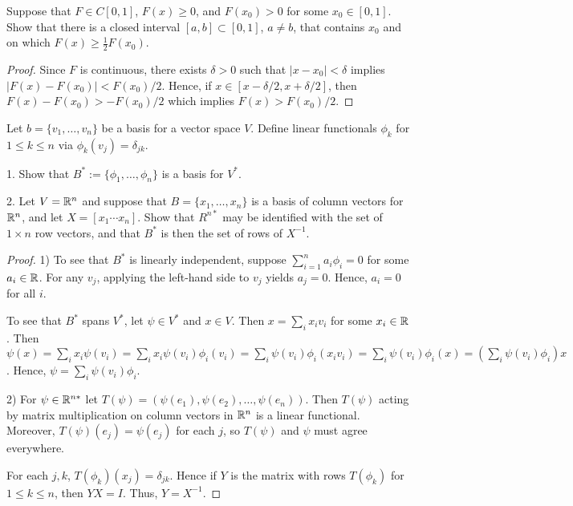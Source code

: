 \documentclass{article}
\begin{document}
 Suppose that $F \in C[0,1]$, $F(x) \ge 0$, and $F(x_0) > 0$ for some $x_0 \in [0,1]$. Show that there is a closed interval $[a,b] \subset [0,1]$, $a \ne b$, that contains $x_0$ and on which $F(x) \ge \frac 1 2 F(x_0)$.

\begin{proof}
Since $F$ is continuous, there exists $\delta > 0$ such that 
$|x - x_0| < \delta$ implies $|F(x) - F(x_0)| < F(x_0)/2$.  Hence, if $x \in [x - \delta/2, x + \delta/2]$,  then $F(x) - F(x_0) > -F(x_0)/2$ which implies $F(x) > F(x_0)/2$.
\end{proof}

 Let $b = \{v_1, \ldots, v_n\}$ be a basis for a vector space $V$. Define linear functionals $\phi_k$ for $1 \le k \le n$ via $\phi_k(v_j) = \delta_{jk}$.

1. Show that $B^* := \{\phi_1, \ldots, \phi_n\}$ is a basis for $V^*$.

2. Let $V = \mathbb{R}^n$ and suppose that $B = \{ x_1, \ldots, x_n\}$ is a basis of column vectors for $\mathbb{R}^n$, and let $X = [x_1 \cdots x_n]$. Show that $R^{n*}$ may be identified with the set of $1 \times n$ row vectors, and that $B^*$ is then the set of rows of $X^{-1}$.

\begin{proof}
1) To see that $B^*$ is linearly independent, suppose $\sum_{i=1}^n a_i \phi_i = 0$ for some $a_i \in \mathbb{R}$.  For any $v_j$, applying the left-hand side to $v_j$ yields $a_j = 0$. Hence, $a_i = 0$ for all $i$.

To see that $B^*$ spans $V^*$, let $\psi \in V^*$ and $x \in V$.  Then $x = \sum_i x_i v_i$ for some $x_i \in \mathbb{R}$. Then $\psi(x) = \sum_i x_i \psi(v_i) = \sum_i x_i \psi(v_i) \phi_i(v_i) = \sum_i \psi(v_i) \phi_i(x_iv_i) = \sum_i \psi(v_i) \phi_i(x) = (\sum_i \psi(v_i) \phi_i) x$. Hence, $\psi = \sum_i \psi(v_i) \phi_i$.

2) For $\psi \in \mathbb{R}^{n*}$ let $T(\psi) = (\psi(e_1), \psi(e_2), \ldots, \psi(e_n))$. Then $T(\psi)$ acting by matrix multiplication on column vectors in $\mathbb{R}^n$ is a linear functional. Moreover, $T(\psi)(e_j) = \psi(e_j)$ for each $j$, so $T(\psi)$ and $\psi$ must agree everywhere.

For each $j,k$, $T(\phi_k)(x_j) = \delta_{jk}$. Hence if $Y$ is the matrix with rows $T(\phi_k)$ for $1 \le k \le n$, then $YX = I$. Thus, $Y = X^{-1}$.
\end{proof}
\end{document}
